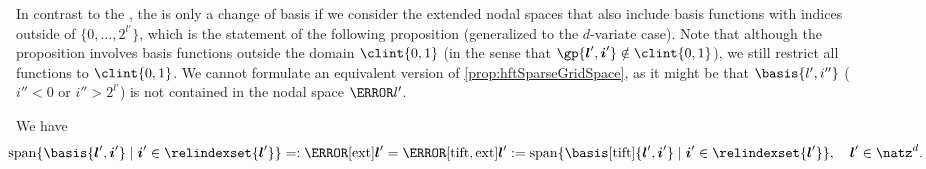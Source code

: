 In contrast to the \hftr, the \tiftr is only a change of basis
if we consider the extended nodal spaces that also include
basis functions with indices outside of $\{0, \dotsc, 2^{l'}\}$,
which is the statement of the following proposition
(generalized to the $d$-variate case).
Note that although the proposition involves basis functions outside
the domain $\clint{0, 1}$
(in the sense that $\gp{\*l',\*i'} \notin \clint{0, 1}$),
we still restrict all functions to $\clint{0, 1}$.
We cannot formulate an equivalent version of \cref{prop:hftSparseGridSpace},
as it might be that $\basis{l',i''}$ ($i'' < 0$ or $i'' > 2^{l'}$)
is not contained in the nodal space $\ns{l'}$.

\begin{proposition}
  \label{prop:tiftNodalSpace}
  We have
  \begin{equation}
    \hspace*{-10mm}
    \spn\{\basis{\*l',\*i'} \mid \*i' \in \relindexset{\*l'}\}
    =: \ns[\ext]{\*l'}
    = \ns[\tift,\ext]{\*l'}
    := \spn\{\basis[\tift]{\*l',\*i'} \mid \*i' \in \relindexset{\*l'}\},\quad
    \*l' \in \natz^d.
    \hspace*{-20mm}
  \end{equation}
\end{proposition}

